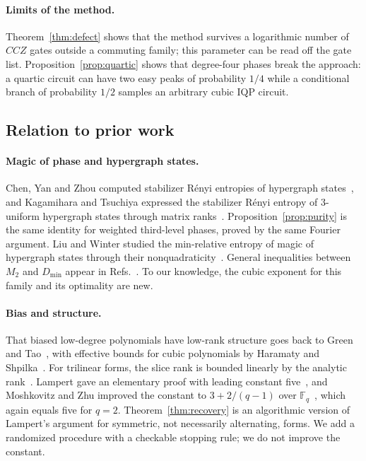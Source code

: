 \documentclass[a4paper,onecolumn,11pt,unpublished]{quantumarticle}
\theoremstyle{plain}
\theoremstyle{remark}
\begin{document}
\paragraph{Limits of the method.}
Theorem~\ref{thm:defect} shows that the method survives a logarithmic number of $CCZ$ gates outside a commuting family; this parameter can be read off the gate list. Proposition~\ref{prop:quartic} shows that degree-four phases break the approach: a quartic circuit can have two easy peaks of probability $1/4$ while a conditional branch of probability $1/2$ samples an arbitrary cubic IQP circuit.

\subsection{Relation to prior work}

\paragraph{Magic of phase and hypergraph states.}
Chen, Yan and Zhou computed stabilizer R\'enyi entropies of hypergraph states~\cite{CYZ24}, and Kagamihara and Tsuchiya expressed the stabilizer R\'enyi entropy of $3$-uniform hypergraph states through matrix ranks~\cite[Theorem~1]{KT26}. Proposition~\ref{prop:purity} is the same identity for weighted third-level phases, proved by the same Fourier argument. Liu and Winter studied the min-relative entropy of magic of hypergraph states through their nonquadraticity~\cite{LW22}. General inequalities between $M_2$ and $D_{\min}$ appear in Refs.~\cite{HP23,HLK24,TFH25}. To our knowledge, the cubic exponent for this family and its optimality are new.

\paragraph{Bias and structure.}
That biased low-degree polynomials have low-rank structure goes back to Green and Tao~\cite{GT09}, with effective bounds for cubic polynomials by Haramaty and Shpilka~\cite{HS10}. For trilinear forms, the slice rank is bounded linearly by the analytic rank~\cite{AKZ21,CM22}. Lampert gave an elementary proof with leading constant five~\cite{Lam25}, and Moshkovitz and Zhu improved the constant to $3+2/(q-1)$ over $\mathbb{F}_q$~\cite{MZ26}, which again equals five for $q=2$. Theorem~\ref{thm:recovery} is an algorithmic version of Lampert's argument for symmetric, not necessarily alternating, forms. We add a randomized procedure with a checkable stopping rule; we do not improve the constant.
\end{document}
